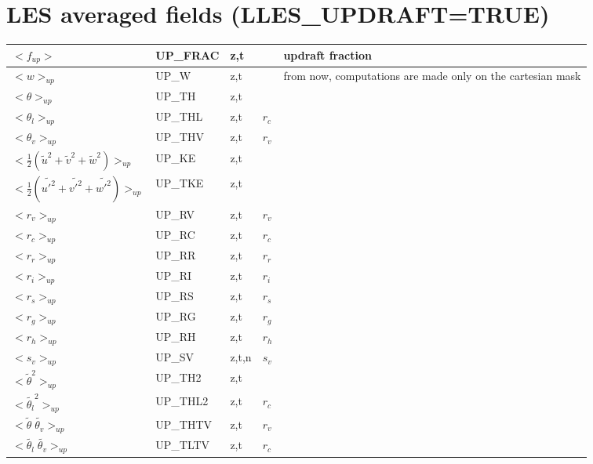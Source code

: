 \section{LES averaged fields (LLES\_UPDRAFT=TRUE)}
\begin{center}
\begin{makeimage}
\begin{tabular}{||p{6cm}|>{\centering}p{2.5cm}|>{\centering}p{1.5cm}|>{\centering}p{0.9cm}|p{4.1cm }||}
\hline
\hline
$<f_{up}>$ & UP\_FRAC & z,t & & updraft fraction \\
\hline
$<w>_{up}$ & UP\_W & z,t & &\multirow{15}{4.1cm}{ from now, computations are made only on the cartesian mask}\\
\cline{1-4}
$<\theta>_{up}$& UP\_TH & z,t & & \\
\cline{1-4}
$<\theta_l>_{up}$& UP\_THL & z,t & $r_c$ & \\
\cline{1-4}
$<\theta_v>_{up}$& UP\_THV & z,t & $r_v$ & \\
\cline{1-4}
$<\frac{1}{2}(\tilde{u}^2+\tilde{v}^2+\tilde{w}^2)>_{up}$ & UP\_KE & z,t & & \\
\cline{1-4}
$<\frac{1}{2}(\tilde{u'^2}+\tilde{v'^2}+\tilde{w'^2})>_{up}$ & UP\_TKE & z,t & & \\
\cline{1-4}
$<r_v>_{up}$ & UP\_RV & z,t & $r_v$ & \\
\cline{1-4}
$<r_c>_{up}$& UP\_RC & z,t & $r_c$ & \\
\cline{1-4}
$<r_r>_{up}$& UP\_RR & z,t & $r_r$ & \\
\cline{1-4}
$<r_i>_{up}$ & UP\_RI & z,t & $r_i$ & \\
\cline{1-4}
$<r_s>_{up}$& UP\_RS & z,t & $r_s$ & \\
\cline{1-4}
$<r_g>_{up}$ & UP\_RG & z,t & $r_g$ & \\
\cline{1-4}
$<r_h>_{up}$ & UP\_RH & z,t & $r_h$ & \\
\cline{1-4}
$<s_v>_{up}$ & UP\_SV & z,t,n & $s_v$ & \\
\cline{1-4}
$<{\tilde{\theta}^2}>_{up}$ & UP\_TH2 & z,t &  & \\
\cline{1-4}
$<{\tilde{\theta_l}^2}>_{up}$& UP\_THL2 & z,t & $r_c$ & \\
\cline{1-4}
$<{\tilde{\theta}\;\tilde{\theta_v}}>_{up}$ & UP\_THTV & z,t & $r_v$ & \\
\cline{1-4}
$<{\tilde{\theta_l}\;\tilde{\theta_v}}>_{up}$ & UP\_TLTV & z,t & $r_c$ & \\

\end{tabular}
\end{makeimage}
\end{center}
